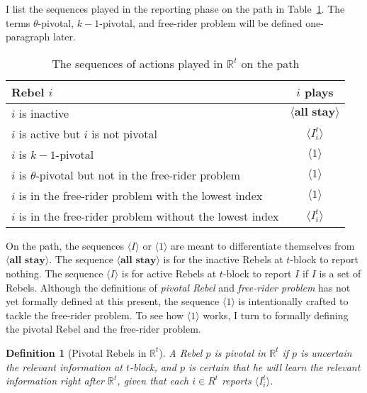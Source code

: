 \documentclass[12pt,letter]{article}
\newcommand{\Omicron}{\mathbb{R}}
\newtheorem{definition}{Definition}[section]
\theoremstyle{definition}
\theoremstyle{definition}
\theoremstyle{remark}
\theoremstyle{claim}
\begin{document}
I list the sequences played in the reporting phase on the path in Table~\ref{Table_msg_RP_path}. The terms $\theta$-pivotal, $k-1$-pivotal, and free-rider problem will be defined one-paragraph later.

\begin{table}[!htbp]
\caption{The sequences of actions played in $\Omicron^t$ on the path}
\label{Table_msg_RP_path}
\begin{center}
\begin{tabular}{l c}
Rebel $i$ & $i$ plays\\
\hline
\hline
$i$ is inactive				& $\langle \textbf{all stay} \rangle$  \\
$i$ is active but $i$ is not pivotal	 					 			& $\langle I^t_i \rangle$  \\
$i$ is $k-1$-pivotal	 					 			& $\langle 1 \rangle$  \\
$i$ is $\theta$-pivotal but not in the free-rider problem	 					 			& $\langle 1 \rangle$  \\
$i$ is in the free-rider problem with the lowest index	 					 			& $\langle 1 \rangle$  \\
$i$ is in the free-rider problem without the lowest index	 					 			& $\langle I^t_i \rangle$  \\
\hline
\end{tabular}
\end{center}
\end{table}

On the path, the sequences $\langle I \rangle$ or $\langle 1 \rangle$ are meant to differentiate themselves from $\langle \textbf{all stay} \rangle$. The sequence $\langle \textbf{all stay} \rangle$ is for the inactive Rebels at $t$-block to report nothing. The sequence $\langle I \rangle$ is for active Rebels at $t$-block to report $I$ if $I$ is a set of Rebels. Although the definitions of \textit{pivotal Rebel} and \textit{free-rider problem} has not yet formally defined at this present, the sequence $\langle 1 \rangle$ is intentionally crafted to tackle the free-rider problem. To see how $\langle 1 \rangle$ works, I turn to formally defining the {pivotal Rebel} and the {free-rider problem}. 

\begin{definition}[Pivotal Rebels in $\Omicron^t$]
A Rebel $p$ is pivotal in $\Omicron^t$ if $p$ is uncertain the relevant information at $t$-block, and $p$ is certain that he will learn the relevant information right after $\Omicron^t$, given that each $i\in R^t$ reports $\langle I^t_i \rangle$.
\end{definition}
\end{document}

